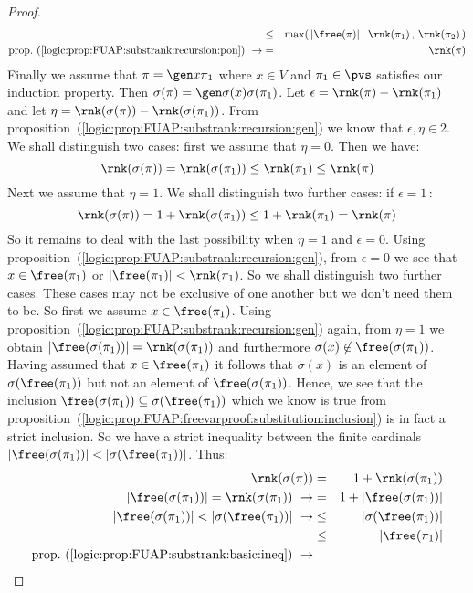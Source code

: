 \begin{proof}
\begin{eqnarray*}
    &\leq&\max(\,|\free(\pi)|\,,\,
    \rnk(\pi_{1})\,,\,\rnk(\pi_{2})\,)\\
    \mbox{prop.~(\ref{logic:prop:FUAP:substrank:recursion:pon})}\ \rightarrow
    &=&\rnk(\pi)
    \end{eqnarray*}
Finally we assume that $\pi=\gen x\pi_{1}$ where $x\in V$ and
$\pi_{1}\in\pvs$ satisfies our induction property. Then
$\sigma(\pi)=\gen\sigma(x)\sigma(\pi_{1})$. Let $\epsilon
=\rnk(\pi)-\rnk(\pi_{1})$ and let
$\eta=\rnk(\sigma(\pi))-\rnk(\sigma(\pi_{1}))$. From
proposition~(\ref{logic:prop:FUAP:substrank:recursion:gen}) we know
that $\epsilon,\eta\in 2$. We shall distinguish two cases: first we
assume that $\eta=0$. Then we have:
    \[
    \rnk(\sigma(\pi))=\rnk(\sigma(\pi_{1}))\leq\rnk(\pi_{1})\leq\rnk(\pi)
    \]
Next we assume that $\eta=1$. We shall distinguish two further
cases: if $\epsilon=1$\,:
    \[
    \rnk(\sigma(\pi))=1+\rnk(\sigma(\pi_{1}))\leq1+\rnk(\pi_{1})=\rnk(\pi)
    \]
So it remains to deal with the last possibility when $\eta=1$ and
$\epsilon=0$. Using
proposition~(\ref{logic:prop:FUAP:substrank:recursion:gen}), from
$\epsilon=0$ we see that $x\in\free(\pi_{1})$ or
$|\free(\pi_{1})|<\rnk(\pi_{1})$. So we shall distinguish two
further cases. These cases may not be exclusive of one another but
we don't need them to be. So first we assume $x\in\free(\pi_{1})$.
Using proposition~(\ref{logic:prop:FUAP:substrank:recursion:gen})
again, from $\eta=1$ we obtain
$|\free(\sigma(\pi_{1}))|=\rnk(\sigma(\pi_{1}))$ and furthermore
$\sigma(x)\not\in\free(\sigma(\pi_{1}))$. Having assumed that
$x\in\free(\pi_{1})$ it follows that $\sigma(x)$ is an element of
$\sigma(\free(\pi_{1}))$ but not an element of
$\free(\sigma(\pi_{1}))$. Hence, we see that the inclusion
$\free(\sigma(\pi_{1}))\subseteq\sigma(\free(\pi_{1}))$ which we
know is true from
proposition~(\ref{logic:prop:FUAP:freevarproof:substitution:inclusion})
is in fact a strict inclusion. So we have a strict inequality
between the finite cardinals
$|\free(\sigma(\pi_{1}))|<|\sigma(\free(\pi_{1}))|$. Thus:
    \begin{eqnarray*}
    \rnk(\sigma(\pi))&=&1+\rnk(\sigma(\pi_{1}))\\
    |\free(\sigma(\pi_{1}))|=\rnk(\sigma(\pi_{1}))\ \rightarrow
    &=&1+|\free(\sigma(\pi_{1}))|\\
    |\free(\sigma(\pi_{1}))|<|\sigma(\free(\pi_{1}))|\ \rightarrow
    &\leq&|\sigma(\free(\pi_{1}))|\\
    &\leq&|\free(\pi_{1})|\\
    \mbox{prop.~(\ref{logic:prop:FUAP:substrank:basic:ineq})}\ \rightarrow

\end{eqnarray*}
\end{proof}
